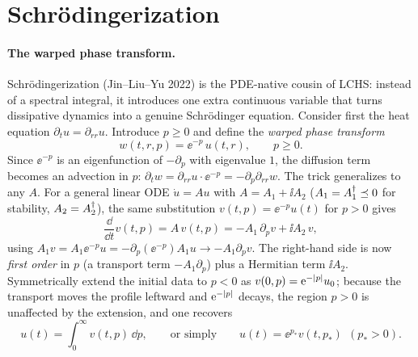 \section{Schr\"odingerization}
\label{sec:lec13-5}

\paragraph{The warped phase transform.}
Schr\"odingerization (Jin--Liu--Yu 2022) is the PDE-native cousin of LCHS: instead of a spectral
integral, it introduces one extra continuous variable that turns dissipative dynamics into a
genuine Schr\"odinger equation. Consider first the heat equation $\partial_t u=\partial_{rr}u$.
Introduce $p\ge0$ and define the \emph{warped phase transform}
\begin{equation}
  w(t,r,p)=\ee^{-p}\,u(t,r),\qquad p\ge0.
  \label{eq:lec13-warp}
\end{equation}
Since $\ee^{-p}$ is an eigenfunction of $-\partial_p$ with eigenvalue $1$, the diffusion term
becomes an advection in $p$: $\partial_t w=\partial_{rr}u\cdot\ee^{-p}=-\partial_p\partial_{rr}w$.
The trick generalizes to any $A$. For a general linear ODE $\dot u=Au$ with $A=A_1+\ii A_2$
($A_1=A_1^{\dagger}\preceq0$ for stability, $A_2=A_2^{\dagger}$), the same substitution $v(t,p)=\ee^{-p}u(t)$
for $p>0$ gives
\begin{equation}
  \frac{\dd}{\dd t}v(t,p)=A\,v(t,p)=-A_1\,\partial_p v+\ii A_2\,v,
  \label{eq:lec13-warp-general}
\end{equation}
using $A_1 v=A_1\ee^{-p}u=-\partial_p(\ee^{-p})A_1 u\to-A_1\partial_p v$. The right-hand side is
now \emph{first order} in $p$ (a transport term $-A_1\partial_p$) plus a Hermitian term
$\ii A_2$. Symmetrically extend the initial data to $p<0$ as $v(0,p)=\mathrm{e}^{-\left\lvert p \right\rvert}u_0$; because
the transport moves the profile leftward and $\mathrm{e}^{-\left\lvert p \right\rvert}$ decays, the region $p>0$ is
unaffected by the extension, and one recovers
\begin{equation}
  u(t)=\int_0^\infty v(t,p)\,\dd p,\qquad\text{or simply}\qquad u(t)=\ee^{p_*}v(t,p_*)\ \ (p_*>0).
  \label{eq:lec13-recover}
\end{equation}

